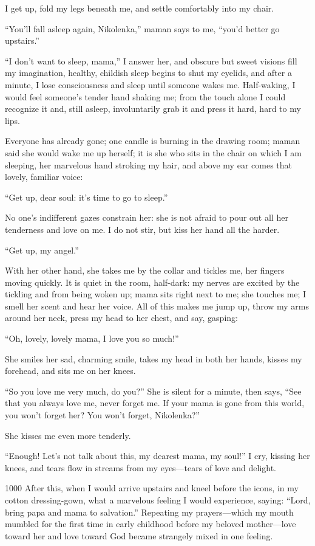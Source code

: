 I get up, fold my legs beneath me, and settle comfortably into my chair.

``You'll fall asleep again, Nikolenka,'' maman says to me, ``you'd better go upstairs.'' %

``I don't want to sleep, mama,'' I answer her, and obscure but sweet visions fill my imagination, healthy, childish sleep begins to shut my eyelids, and after a minute, I lose consciousness and sleep until someone wakes me. Half-waking, I would feel someone's tender hand shaking me; from the touch alone I could recognize it and, still asleep, involuntarily grab it and press it hard, hard to my lips. %

Everyone has already gone; one candle is burning in the drawing room; maman said she would wake me up herself; it is she who sits in the chair on which I am sleeping, her marvelous hand stroking my hair, and above my ear comes that lovely, familiar voice:

``Get up, dear soul: it's time to go to sleep.'' %

No one's indifferent gazes constrain her: she is not afraid to pour out all her tenderness and love on me. I do not stir, but kiss her hand all the harder.

``Get up, my angel.'' %

With her other hand, she takes me by the collar and tickles me, her fingers moving quickly. It is quiet in the room, half-dark: my nerves are excited by the tickling and from being woken up; mama sits right next to me; she touches me; I smell her scent and hear her voice. All of this makes me jump up, throw my arms around her neck, press my head to her chest, and say, gasping:

``Oh, lovely, lovely mama, I love you so much!'' %

She smiles her sad, charming smile, takes my head in both her hands, kisses my forehead, and sits me on her knees.

``So you love me very much, do you?'' She is silent for a minute, then says, ``See that you always love me, never forget me. If your mama is gone from this world, you won't forget her? You won't forget, Nikolenka?'' %

She kisses me even more tenderly.

``Enough! Let's not talk about this, my dearest mama, my soul!'' I cry, kissing her knees, and tears flow in streams from my eyes---tears of love and delight. %

\begin{tolerant}{1000}
After this, when I would arrive upstairs and kneel before the icons, in my cotton dressing-gown, what a marvelous feeling I would experience, saying: ``Lord, bring papa and mama to salvation.'' Repeating my prayers---which my mouth mumbled for the first time in early childhood before my beloved mother---love toward her and love toward God became strangely mixed in one feeling.
\end{tolerant}


